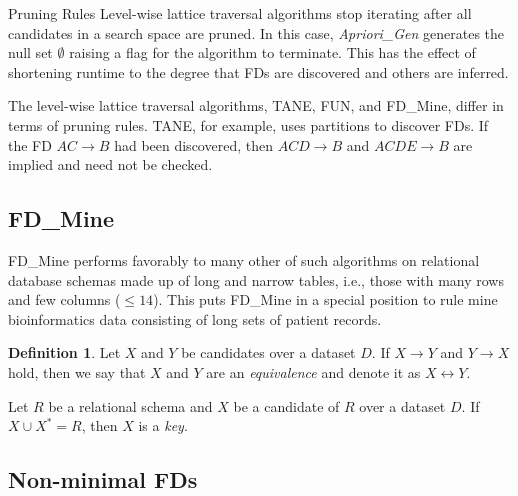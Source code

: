 \documentclass[6pt,twoside]{article}
\theoremstyle{plain}
\theoremstyle{definition}
\newtheorem{defn}{Definition}[section]
\begin{document}
\begin{section}{Pruning Rules}
Level-wise lattice traversal algorithms stop iterating after all candidates in a search space are pruned. In this case, \textit{Apriori\_Gen} generates the null set $\emptyset$ raising a flag for the algorithm to terminate. This has the effect of shortening runtime to the degree that FDs are discovered and others are inferred.

The level-wise lattice traversal algorithms, TANE, FUN, and FD\_Mine, differ in terms of pruning rules. TANE, for example, uses partitions to discover FDs. If the FD $AC \rightarrow B$ had been discovered, then $ACD \rightarrow B$ and $ACDE \rightarrow B$ are implied and need not be checked.

\subsection[FD\_Mine]{FD\_Mine}

FD\_Mine performs favorably to many other of such algorithms on relational database schemas made up of long and narrow tables, i.e., those with many rows and few columns ($\leq14$). This puts FD\_Mine in a special position to rule mine bioinformatics data consisting of long sets of patient records. 

\begin{defn}
	\label{eq}
	Let $X$ and $Y$ be candidates over a dataset $D$. If $X \rightarrow Y$ and $Y \rightarrow X$ hold, then we say that $X$ and $Y$ are an \textit{equivalence} and denote it as $X \leftrightarrow Y$. 
\end{defn}

Let $R$ be a relational schema and $X$ be a candidate of $R$ over a dataset $D$. If $X \cup X^{*} = R$, then $X$ is a \textit{key}.


\subsection[Non-minimal FDs]{Non-minimal FDs}


\end{section}
\end{document}
